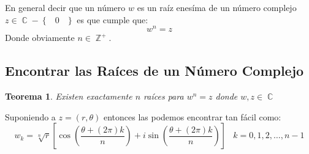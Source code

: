 \documentclass[12pt, fleqn]{report}                             %
\DeclareMathOperator \Space {\quad}                             %
\DeclareMathOperator \MiniSpace {\;}                            %
\newtheorem{Theorem}{Teorema}[section]                          %
\newcommand{\Set}[1]{\left\{ \MiniSpace #1 \MiniSpace \right\}} %
\newcommand{\Brackets}[1]{\left[ #1 \right]}                    %
\newcommand{\Wrap}[1]{\left( #1 \right)}                        %
\DeclareMathOperator \Integers  {\mathbb{Z}}                     %
\DeclareMathOperator \Complexs  {\mathbb{C}}                     %
\newcommand{\Cos}[1]{\cos\Wrap{#1}}                             %
\newcommand{\Sin}[1]{\sin\Wrap{#1}}                             %
\newcommand \Cis[1]  {\Cos{#1} + i \Sin{#1}}                    %
\newcommand \bCis[1] {\Brackets{\Cis{#1}}}                      %
\begin{document}
            En general decir que un número $w$ es un raíz enesíma de un número complejo
            $z \in \Complexs - \Set{0}$ es que cumple que:
            \begin{equation*}
                w^n = z
            \end{equation*}
            Donde obviamente $n \in \Integers^+$.



            \subsection{Encontrar las Raíces de un Número Complejo}

                \begin{Theorem}
                    {Existen exactamente $n$ raíces para $w^n = z$ donde $w, z \in \Complexs$}
                \end{Theorem}

                    Suponiendo a $z = (r, \theta)$ entonces las podemos encontrar tan fácil como:
                    \begin{equation}
                        w_k = \sqrt[n]{r} \bCis{\dfrac{\theta + (2\pi) k}{n}}
                        \MiniSpace k = 0, 1, 2, \dots, n-1
                    \end{equation}
\end{document}
